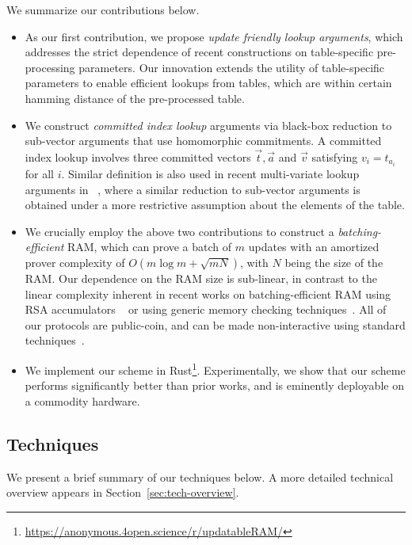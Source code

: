 We summarize our contributions below.
\begin{itemize}[leftmargin=2em]
	\item As our first contribution, we propose {\em update friendly lookup arguments}, which addresses
	the strict dependence of recent constructions on table-specific pre-processing parameters. Our
	innovation extends the utility of table-specific parameters to enable efficient lookups from tables,
	which are within certain hamming distance of the pre-processed table.
	\item We construct {\em committed index lookup} arguments via black-box reduction to
	sub-vector arguments that use homomorphic commitments. A committed index lookup involves
	three committed vectors $\vec{t},\vec{a}$ and $\vec{v}$ satisfying $v_i=t_{a_i}$ for all $i$. Similar
	definition is also used in recent multi-variate lookup arguments in ~\cite{lasso}, where a similar reduction
	to sub-vector arguments is obtained under a more restrictive assumption about the elements of the table.
	\item We crucially employ the above two contributions to construct a {\em batching-efficient} RAM, which
	can prove a batch of $m$ updates with an amortized prover complexity of $O(m\log m + \sqrt{mN})$,
	with $N$ being the size of the RAM. Our dependence on the RAM size is sub-linear, in contrast to the linear complexity
	inherent in recent works on batching-efficient RAM using RSA accumulators ~\cite{USENIX:OWWB20,CCS:CFHKKO22} or using generic memory checking techniques~\cite{NDSS:WSRBW15,USENIX:BCTV14,C:BCGTV13,SP:ZGKPP18}. All of our protocols are public-coin, and can be made non-interactive using standard techniques~\cite{C:FiaSha86}. 
	
	\item We implement our scheme in Rust\footnote{\url{https://anonymous.4open.science/r/updatableRAM/}}.
	Experimentally, we show that our scheme performs significantly better than prior works,
	and is eminently deployable on a commodity hardware.
\end{itemize}


\subsection{Techniques}\label{subsec:techniques}

We present a brief summary of our techniques below. A more detailed technical overview appears in Section~\ref{sec:tech-overview}.

\smallskip

